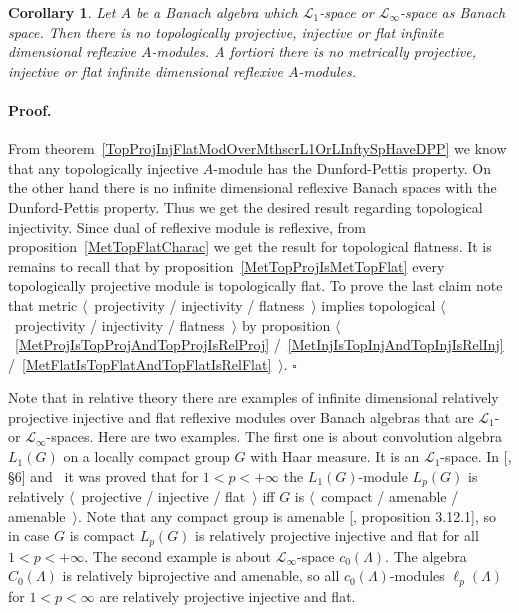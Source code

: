 \documentclass[12pt]{article}
\newtheorem{corollary}[theorem]{Corollary}
\renewenvironment{proof}{\paragraph{Proof.}}{\hfill$\square$\medskip}
\begin{document}
\begin{corollary}\label{NoInfDimRefMetTopProjInjFlatModOverMthscrL1OrLInfty} Let
    $A$ be a Banach algebra which $\mathscr{L}_1$-space or
    $\mathscr{L}_\infty$-space as Banach space. Then there is no topologically
    projective, injective or flat infinite dimensional reflexive $A$-modules. A
    fortiori there is no metrically projective, injective or flat infinite
    dimensional reflexive $A$-modules.
\end{corollary}
\begin{proof} From theorem~\ref{TopProjInjFlatModOverMthscrL1OrLInftySpHaveDPP}
    we know that any topologically injective $A$-module has the Dunford-Pettis
    property. On the other hand there is no infinite dimensional reflexive
    Banach spaces with the Dunford-Pettis property. Thus we get the desired
    result regarding topological injectivity. Since dual of reflexive module is
    reflexive, from proposition~\ref{MetTopFlatCharac} we get the result for
    topological flatness. It is remains to recall that by
    proposition~\ref{MetTopProjIsMetTopFlat}  every topologically projective
    module is topologically flat. To prove the last claim note that metric
    $\langle$~projectivity / injectivity / flatness~$\rangle$ implies
    topological $\langle$~projectivity / injectivity / flatness~$\rangle$ by
    proposition $\langle$~\ref{MetProjIsTopProjAndTopProjIsRelProj}
    /~\ref{MetInjIsTopInjAndTopInjIsRelInj}
    /~\ref{MetFlatIsTopFlatAndTopFlatIsRelFlat}~$\rangle$.
\end{proof}

Note that in relative theory there are examples of infinite dimensional
relatively projective injective and flat reflexive modules over Banach algebras
that are $\mathscr{L}_1$- or $\mathscr{L}_\infty$-spaces. Here are two examples.
The first one is about convolution algebra $L_1(G)$ on a locally compact group
$G$ with Haar measure. It is an $\mathscr{L}_1$-space.
In [\cite{DalPolHomolPropGrAlg}, \S6] and~\cite{RachInjModAndAmenGr} it
was proved that for $1<p<+\infty$ the $L_1(G)$-module $L_p(G)$ is relatively
$\langle$~projective / injective / flat~$\rangle$ iff $G$ is $\langle$~compact /
amenable / amenable~$\rangle$. Note that any compact group is
amenable [\cite{PierAmenLCA}, proposition 3.12.1], so in case $G$ is
compact $L_p(G)$ is relatively projective injective and flat for all
$1<p<+\infty$.  The second example is about $\mathscr{L}_\infty$-space
$c_0(\Lambda)$. The algebra $C_0(\Lambda)$ is relatively biprojective and
amenable, so all $c_0(\Lambda)$-modules $\ell_p(\Lambda)$ for
$1<p<\infty$ are relatively projective injective and flat.



\end{document}
